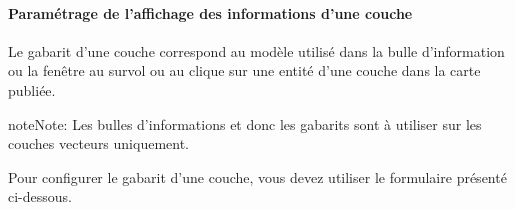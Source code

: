 \documentclass[letterpaper,10pt,french]{sphinxmanual}
\begin{document}
\paragraph{Paramétrage de l'affichage des informations d'une couche}
\label{maps/layerstree:parametrage-de-l-affichage-des-informations-d-une-couche}
Le gabarit d'une couche correspond au modèle utilisé dans la bulle
d'information ou la fenêtre au survol ou au clique sur une entité
d'une couche dans la carte publiée.

\begin{notice}{note}{Note:}
Les bulles d'informations et donc les gabarits sont à utiliser
sur les couches vecteurs uniquement.
\end{notice}

Pour configurer le gabarit d'une couche, vous devez utiliser le
formulaire présenté ci-dessous.
\end{document}
